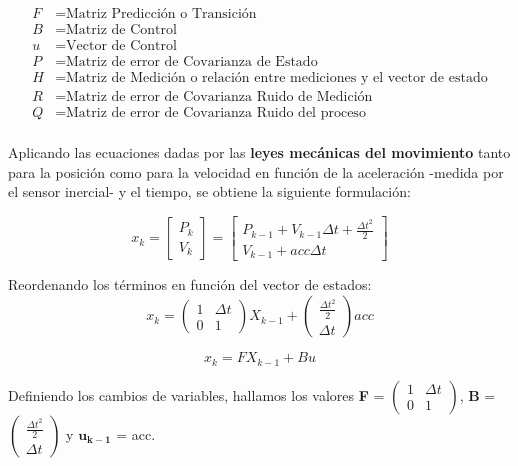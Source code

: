 \begin{align*}
    F &= \text{Matriz Predicción o Transición} \\
    B &= \text{Matriz de Control} \\
    u &= \text{Vector de Control} \\
    P &= \text{Matriz de error de Covarianza de Estado} \\
    H &= \text{Matriz de Medición o relación entre mediciones y el vector de estado} \\
    R &= \text{Matriz de error de Covarianza Ruido de Medición} \\
    Q &= \text{Matriz de error de Covarianza Ruido del proceso} \\
\end{align*}

\noindent Aplicando las ecuaciones dadas por las \textbf{leyes mecánicas del movimiento} tanto para la posición como para la velocidad en función de la aceleración -medida por el sensor inercial- y el tiempo, se obtiene la siguiente formulación:

\[ 
x_k =\begin{bmatrix}
P_k\\
V_k
\end{bmatrix} = \begin{bmatrix}
P_{k-1} + V_{k-1}\Delta t +\frac{\Delta t^2}{2} \\
V_{k-1} + acc\Delta t
\end{bmatrix}
\]  


\noindent Reordenando los términos en función del vector de estados:
\begin{equation}
    x_k = \begin{pmatrix}
              1 & \Delta t\\ 
                 0 & 1
            \end{pmatrix} X_{k-1} +
            \begin{pmatrix}
  \frac{\Delta t^2}{2}\\ 
  \Delta t
\end{pmatrix} acc
\end{equation}  

\begin{equation}
     x_k = F X_{k-1} + B u
\end{equation}

\noindent Definiendo los cambios de variables, hallamos los valores \textbf{F} = $\begin{pmatrix}
              1 & \Delta t\\ 
                 0 & 1
            \end{pmatrix}$, \textbf{B} =$\begin{pmatrix}
  \frac{\Delta t^2}{2}\\ 
  \Delta t
\end{pmatrix}$ y $\boldsymbol{u_{k-1}}$ = acc. 

